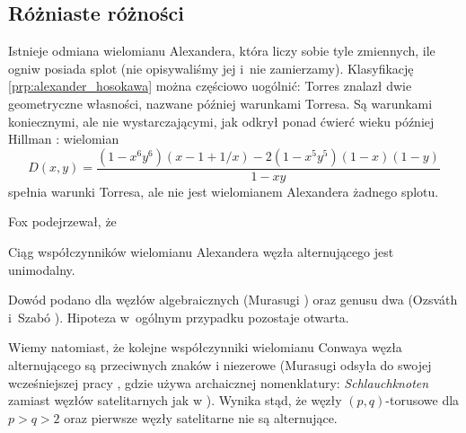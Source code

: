 
\subsection{Różniaste różności}
Istnieje odmiana wielomianu Alexandera, która liczy sobie tyle zmiennych, ile ogniw posiada splot (nie opisywaliśmy jej i~nie zamierzamy).
Klasyfikację \ref{prp:alexander_hosokawa} można częściowo uogólnić: Torres \cite{torres53} znalazł dwie geometryczne własności, nazwane później warunkami Torresa.
%
%
Są warunkami koniecznymi, ale nie wystarczającymi, jak odkrył ponad ćwierć wieku później Hillman \cite{hillman81}: wielomian
%
\begin{equation}
    D(x,y) = \frac{(1 - x^6y^6)(x - 1 + 1/x) - 2(1 - x^5y^5)(1 - x)(1 - y)}{1-xy}
\end{equation}
spełnia warunki Torresa, ale nie jest wielomianem Alexandera żadnego splotu.

Fox \cite{fox62} podejrzewał, że
%
\begin{conjecture}
%
    Ciąg współczynników wielomianu Alexandera węzła alternującego jest unimodalny.
\end{conjecture}
Dowód podano dla węzłów algebraicznych (Murasugi \cite{murasugi85}) oraz genusu dwa (Ozsváth i~Szabó \cite{ozsvath03}).
%
%
%
Hipoteza w~ogólnym przypadku pozostaje otwarta.

Wiemy natomiast, że kolejne współczynniki wielomianu Conwaya węzła alternującego są przeciwnych znaków i niezerowe (Murasugi \cite[s. 242]{murasugi96} odsyła do swojej wcześniejszej pracy \cite{murasugi59}, gdzie używa archaicznej nomenklatury: \emph{Schlauchknoten} zamiast węzłów satelitarnych jak w \cite[s. 245]{schubert53}).
Wynika stąd, że węzły $(p, q)$-torusowe dla $p > q > 2$ oraz pierwsze węzły satelitarne nie są alternujące.


